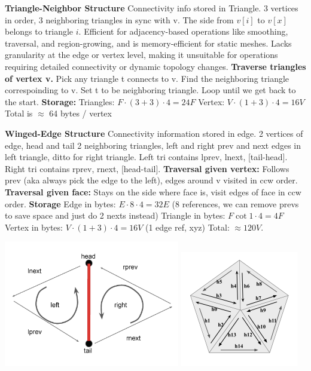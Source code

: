 \documentclass[letterpaper, 8pt]{extarticle}
\begin{document}
\begin{multicols*}{4}
\textbf{Triangle-Neighbor Structure}
Connectivity info stored in Triangle.
3 vertices in order, 3 neighboring triangles in sync with v.
The side from $v[i]$ to $v[x]$ belongs to triangle $i$.
Efficient for adjacency-based operations like smoothing, traversal, and region-growing,
and is memory-efficient for static meshes.
Lacks granularity at the edge or vertex level,
making it unsuitable for operations requiring detailed connectivity or dynamic topology changes.
\textbf{Traverse triangles of vertex v.}
Pick any triangle t connects to v.
Find the neighboring triangle correspoinding to v.
Set t to be neighboring triangle.
Loop until we get back to the start.
\textbf{Storage:}
Triangles: $F \cdot (3 + 3) \cdot 4 = 24F$
Vertex: $V \cdot (1 + 3) \cdot 4 = 16V$
Total is $\approx$ 64 bytes / vertex

\textbf{Winged-Edge Structure}
Connectivity information stored in edge.
2 vertices of edge, head and tail
2 neighboring triangles, left and right
prev and next edges in left triangle,
ditto for right triangle.
Left tri contains lprev, lnext, [tail-head].
Right tri contains rprev, rnext, [head-tail].
\textbf{Traversal given vertex:}
Follows prev (aka always pick the edge to the left),
edges around v visited in ccw order.
\textbf{Traversal given face:}
Stays on the side where face is,
visit edges of face in ccw order.
\textbf{Storage}
Edge in bytes: $E \cdot 8 \cdot 4 = 32E$ (8 references, we can remove prevs to save space and just do 2 nexts instead)
Triangle in bytes: $F \cot 1 \cdot 4 = 4F$
Vertex in bytes: $V \cdot (1 + 3) \cdot 4 = 16V$ (1 edge ref, xyz)
Total: $\approx 120V$.

\includegraphics[width=.3\linewidth]{winged-edge.png}
\includegraphics[width=.3\linewidth]{half-edge.png}


\end{multicols*}
\end{document}
